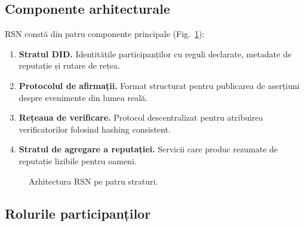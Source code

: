 \documentclass[11pt,a4paper,twocolumn]{article}
\begin{document}
\subsection{Componente arhitecturale}

RSN constă din patru componente principale (Fig.~\ref{fig:architecture}):
\begin{enumerate}[nosep]
\item \textbf{Stratul DID.} Identitățile participanților cu reguli declarate, metadate de reputație și rutare de rețea.
\item \textbf{Protocolul de afirmații.} Format structurat pentru publicarea de aserțiuni despre evenimente din lumea reală.
\item \textbf{Rețeaua de verificare.} Protocol descentralizat pentru atribuirea verificatorilor folosind hashing consistent.
\item \textbf{Stratul de agregare a reputației.} Servicii care produc rezumate de reputație lizibile pentru oameni.
\end{enumerate}

\begin{figure}[ht]
\centering
{}
\caption{Arhitectura RSN pe patru straturi.}
\label{fig:architecture}
\end{figure}

\subsection{Rolurile participanților}
\end{document}
